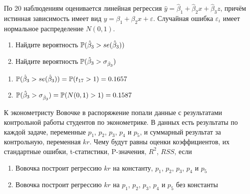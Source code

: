 \documentclass[pdftex,11pt,openany]{book}\usepackage[]{graphicx}\usepackage[]{color}
\begin{document}
\begin{solution}
\end{solution}


\begin{problem}
 По 20 наблюдениям оценивается линейная регрессия $\hat{y}=\hat{\beta}_1 +\hat{\beta}_2 x+\hat{\beta}_3 z$, причём истинная зависимость имеет вид $y=\beta_1 +\beta_2 x+\varepsilon$. Случайная ошибка $\varepsilon_i$ имеет нормальное распределение $N(0,1)$.

\begin{enumerate}
\item Найдите вероятность $\P(\hat{\beta}_3>se(\hat{\beta}_3))$
\item Найдите вероятность $\P(\hat{\beta}_3>\sigma_{\hat{\beta}_3})$
\end{enumerate}
\end{problem}
 
\begin{solution}

\begin{enumerate}
\item $\P(\hat{\beta}_3>se(\hat{\beta}_3))=\P(t_{17}>1)=0.1657$
\item $\P(\hat{\beta}_3>\sigma_{\hat{\beta}_3})=\P(N(0,1)>1)=0.1587$
\end{enumerate}
\end{solution}


\begin{problem}
 К эконометристу Вовочке в распоряжение попали данные с результатами контрольной работы студентов по эконометрике. В данных есть результаты по каждой задаче, переменные $p_1$, $p_2$, $p_3$, $p_4$ и $p_5$, и суммарный результат за контрольную, переменная $kr$. Чему будут равны оценки коэффициентов, их стандартные ошибки, t-статистики, P-значения, $R^2$, $RSS$, если
\begin{enumerate}
\item Вовочка построит регрессию $kr$ на константу, $p_1$, $p_2$, $p_3$, $p_4$ и $p_5$
\item Вовочка построит регрессию $kr$ на $p_1$, $p_2$, $p_3$, $p_4$ и $p_5$ без константы
\end{enumerate}
\end{problem}
 
\begin{solution}
\end{solution}
\end{document}
